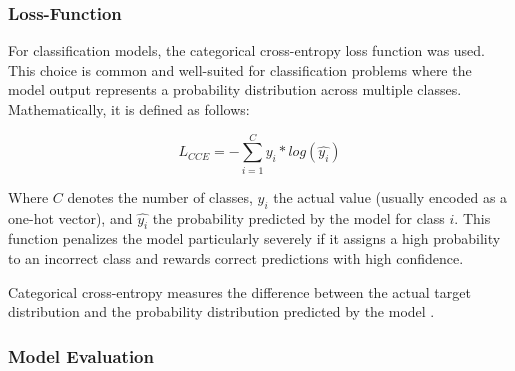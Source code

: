 \subsubsection{Loss-Function}

For classification models, the categorical cross-entropy loss function was used.
This choice is common and well-suited for classification problems where the model output represents a probability distribution across multiple classes.
Mathematically, it is defined as follows:

\[
    L_{CCE} = -\sum_{i=1}^{C} y_i*log(\hat{y_i})
\]

Where $C$ denotes the number of classes, $y_i$ the actual value (usually encoded as a one-hot vector), and $\hat{y_i}$ the probability predicted by the model for class $i$.
This function penalizes the model particularly severely if it assigns a high probability to an incorrect class and rewards correct predictions with high confidence.

Categorical cross-entropy measures the difference between the actual target distribution and the probability distribution predicted by the model \cite{springer-ml-basics}.

\subsubsection{Model Evaluation}

